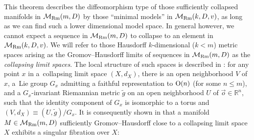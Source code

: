 \documentclass[pdftex]{sigma}
\numberwithin{equation}{section}
\begin{document}
This theorem describes the diffeomorphism type of those
sufficiently collapsed manifolds in $\mathcal{M}_{\rm Rm}(m,D)$ by those ``minimal
models'' in $\mathcal{M}_{\rm Rm}(k,D,v)$, as long as we can find such a lower
dimensional model space. In general however, we cannot expect a sequence in
$\mathcal{M}_{\rm Rm}(m,D)$ to collapse to an element
in $\mathcal{M}_{\rm Rm}(k,D,v)$. We will refer to those Hausdorff $k$-dimensional
($k<m$) metric spaces arising as the Gromov--Hausdorff limits of sequences in
$\mathcal{M}_{\rm Rm}(m,D)$ as the \emph{collapsing limit spaces}. The local
structure of such spaces is described in \cite[Theorem~0.5]{Fukaya88}: for any
point $x$ in a~collapsing limit space $(X,d_X)$, there is an open neighborhood
$V$ of $x$, a~Lie group $G_x$ admitting a faithful representation to ${\rm O}(n)$ (for
some $n\le m$), and a $G_x$-invariant Riemannian metric $\tilde{g}$ on an open
neighborhood $U$ of $\vec{o}\in \mathbb{R}^n$, such that the identity component
of $G_x$ is isomorphic to a torus and $(V,d_X)\equiv (U,\tilde{g})\slash G_x$.
It is consequently shown in \cite{CFG92, Fukaya88, Fukaya89} that a manifold $M\in \mathcal{M}_{\rm Rm}(m,D)$ sufficiently
Gromov--Hausdorff close to a collapsing limit space $X$ exhibits a singular
fibration over $X$:
\end{document}
